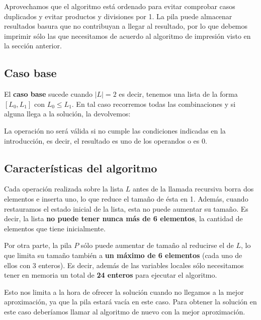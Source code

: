 Aprovechamos que el algoritmo está ordenado para evitar comprobar
casos duplicados y evitar productos y divisiones por 1.
La pila puede almacenar resultados basura que no contribuyan a
llegar al resultado, por lo que debemos imprimir sólo las que
necesitamos de acuerdo al algoritmo de impresión visto en la
sección anterior.

\subsection{Caso base}

El \textbf{caso base} sucede cuando $|L| = 2$ es decir, tenemos
una lista de la forma $[L_0, L_1]$ con $L_0 \leq L_1$.
En tal caso recorremos todas las combinaciones y si alguna llega
a la solución, la devolvemos:

\begin{algo}
\end{algo}

La operación no será válida si no cumple las condiciones indicadas en la introducción,
es decir, el resultado es uno de los operandos o es 0.

\subsection{Características del algoritmo}

Cada operación realizada sobre la lista $L$ antes de la llamada
recursiva borra dos elementos e inserta uno, lo que reduce el
tamaño de ésta en 1. Además, cuando restauramos el estado inicial
de la lista, esta no puede aumentar su tamaño. Es decir, la lista
\textbf{no puede tener nunca más de 6 elementos}, la cantidad
de elementos que tiene inicialmente.

Por otra parte, la pila $P$ sólo puede aumentar de tamaño al
reducirse el de $L$, lo que limita su tamaño también a
\textbf{un máximo de 6 elementos} (cada uno de ellos con 3
enteros). Es decir, además de las variables locales sólo
necesitamos tener en memoria un total de \textbf{24 enteros}
para ejecutar el algoritmo.

Esto nos limita a la hora de ofrecer la solución cuando no llegamos
a la mejor aproximación, ya que la pila estará vacía en este
caso. Para obtener la solución en este caso deberíamos llamar
al algoritmo de nuevo con la mejor aproximación.

